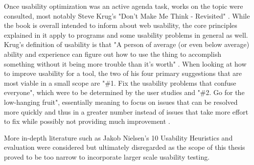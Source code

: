 Once usability optimization was an active agenda task, works on the topic were consulted, most notably Steve Krug's "Don't Make Me Think - Revisited" \cite{DMMThink}. While the book is overall intended to inform about web usability, the core principles explained in it apply to programs and some usability problems in general as well. Krug's definition of usability is that "A person of average (or even below average) ability and experience can figure out how to use the thing to accomplish something without it being more trouble than it's worth" \cite[p.~9]{DMMThink}. When looking at how to improve usability for a tool, the two of his four primary suggestions that are most viable in a small scope are "\#{}1. Fix the usability problems that confuse everyone", which were to be determined by the user studies and "\#{}2. Go for the low-hanging fruit", essentially meaning to focus on issues that can be resolved more quickly and thus in a greater number instead of issues that take more effort to fix while possibly not providing much improvement \cite[p.~178-180]{DMMThink}.

More in-depth literature such as Jakob Nielsen's 10 Usability Heuristics and evaluation \cite{NNG} were considered but ultimately disregarded as the scope of this thesis proved to be too narrow to incorporate larger scale usability testing.
